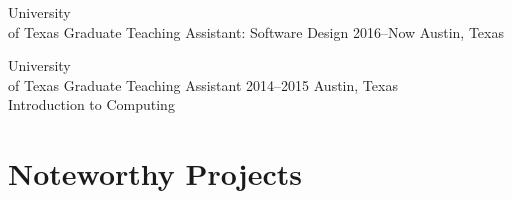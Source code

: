 \documentclass[]{friggeri-cv} %
\begin{document}
\begin{entrylist}

\entry
{University \\ of Texas}
{Graduate Teaching Assistant: Software Design }
{2016--Now}
{Austin, Texas}


\entry
{University \\ of Texas}
{Graduate Teaching Assistant}
{2014--2015}
{Austin, Texas \\
Introduction to Computing }






\end{entrylist}

\section{Noteworthy Projects}
\end{document}
